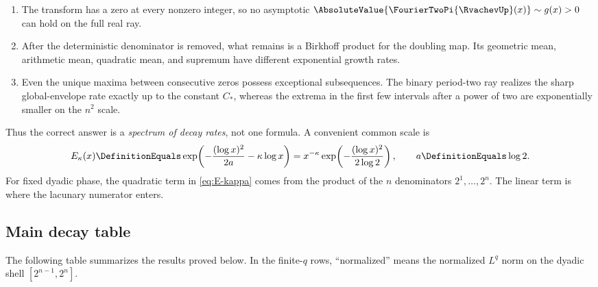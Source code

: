 \documentclass[11pt,oneside]{article}
\numberwithin{equation}{section}
\theoremstyle{definition}
\theoremstyle{remark}
\begin{document}
\begin{enumerate}
\item The transform has a zero at every nonzero integer, so no asymptotic
      $\AbsoluteValue{\FourierTwoPi{\RvachevUp}(x)}\sim g(x)>0$ can hold on the full real ray.
\item After the deterministic denominator is removed, what remains is a Birkhoff product
      for the doubling map.  Its geometric mean, arithmetic mean, quadratic mean, and
      supremum have different exponential growth rates.
\item Even the unique maxima between consecutive zeros possess exceptional subsequences.
      The binary period-two ray realizes the sharp global-envelope rate exactly up to the
      constant $C_*$, whereas the extrema in the first few intervals after a power of two
      are exponentially smaller on the $n^2$ scale.
\end{enumerate}

Thus the correct answer is a \emph{spectrum of decay rates}, not one formula.  A convenient
common scale is
\begin{equation}
 E_\kappa(x)
 \DefinitionEquals\exp\!\left(-\frac{(\log x)^2}{2a}-\kappa\log x\right)
 =x^{-\kappa}\exp\!\left(-\frac{(\log x)^2}{2\log2}\right),
 \qquad a\DefinitionEquals\log2.
 \label{eq:E-kappa}
\end{equation}
For fixed dyadic phase, the quadratic term in \eqref{eq:E-kappa} comes from the product of
the $n$ denominators $2^1,\dots,2^n$.  The linear term is where the lacunary numerator
enters.

\subsection{Main decay table}
\label{subsec:main-table}

The following table summarizes the results proved below.  In the finite-$q$ rows,
``normalized'' means the normalized $L^q$ norm on the dyadic shell
$[2^{n-1},2^n]$.
\end{document}
